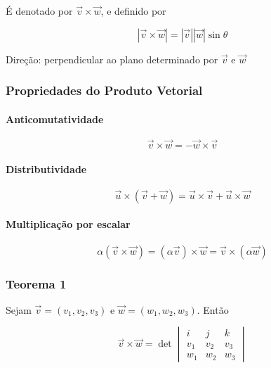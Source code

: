 É denotado por $\vec{v} \times \vec{w}$, e definido por

\[
|\vec{v} \times \vec{w}| = |\vec{v}| |\vec{w}| \sin \theta
\]

Direção: perpendicular ao plano determinado por $\vec{v}$ e $\vec{w}$

\subsubsection{Propriedades do Produto
Vetorial}\label{propriedades-do-produto-vetorial}

\paragraph{Anticomutatividade}\label{anticomutatividade}

\[
\vec{v} \times \vec{w} = - \vec{w} \times \vec{v}
\]

\paragraph{Distributividade}\label{distributividade-2}

\[
\vec{u} \times (\vec{v} + \vec{w}) = \vec{u} \times \vec{v} + \vec{u} \times \vec{w}
\]

\paragraph{Multiplicação por
escalar}\label{multiplicauxe7uxe3o-por-escalar-1}

\[
\alpha (\vec{v} \times \vec{w}) = (\alpha \vec{v}) \times \vec{w} = \vec{v} \times (\alpha \vec{w})
\]

\subsubsection{Teorema 1}\label{teorema-1}

Sejam $\vec{v} = (v_1, v_2, v_3)$ e $\vec{w} = (w_1, w_2, w_3) $. Então

\[
\vec{v} \times \vec{w}
= \det
\begin{vmatrix}
i & j & k \\ 
v_1 & v_2 & v_3 \\ 
w_1 & w_2 & w_3
\end{vmatrix}
\]

